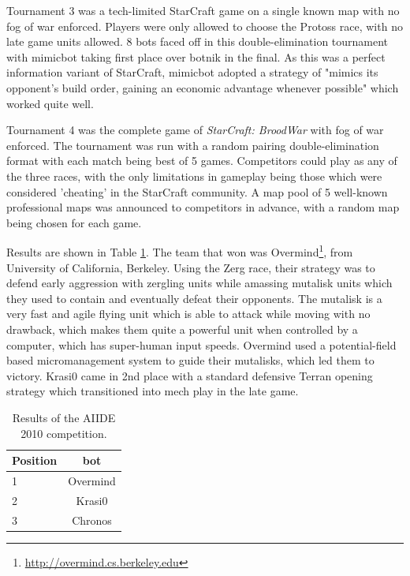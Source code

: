 \documentclass[journal]{IEEEtran}
\begin{document}
Tournament 3 was a tech-limited StarCraft game on a single known map with no fog of war enforced. Players
were only allowed to choose the Protoss race, with no late game units allowed. 8 bots
faced off in this double-elimination tournament with mimicbot taking first place over botnik in the final.
As this was a perfect information variant of StarCraft, mimicbot adopted a strategy of
"mimics its opponent's build order, gaining an economic advantage whenever possible" which
worked quite well.

Tournament 4 was the complete game of {\em StarCraft: BroodWar} with fog of war enforced. The tournament
was run with a random pairing double-elimination format with each match being best of 5 games.
Competitors could play as any of the three races, with the only limitations in gameplay
being those which were considered 'cheating' in the StarCraft community. A map pool of
5 well-known professional maps was announced to competitors in advance, with a random map being chosen for each game.

Results are shown in Table \ref{tab:aiide2010}. The team that won was Overmind\footnote{\url{http://overmind.cs.berkeley.edu}}, from University of California, Berkeley. Using the Zerg race, their
strategy was to defend early aggression with zergling units while amassing mutalisk units
which they used to contain and eventually defeat their opponents. The mutalisk is a very fast and agile
flying unit which is able to attack while moving with no drawback, which makes them quite a powerful
unit when controlled by a computer, which has super-human input speeds. Overmind used a potential-field
based micromanagement system to guide their mutalisks, which led them to victory. Krasi0 came in 2nd place
with a standard defensive Terran opening strategy which transitioned into mech play in the late game.


\begin{table}[t!]
\caption{Results of the AIIDE 2010 competition.}
\label{tab:aiide2010}
\begin{small}
\begin{center}
\begin{tabular}{|l|c|}
\hline
Position & bot\\ \hline
1 & Overmind \\
2 & Krasi0 \\
3 & Chronos \\ \hline
\end{tabular}
\end{center}
\end{small}
\end{table}
\end{document}
